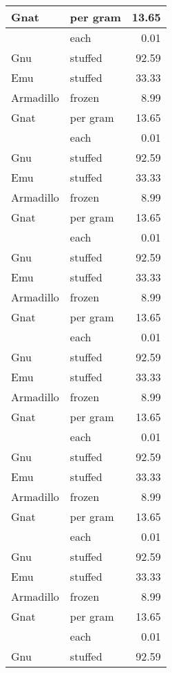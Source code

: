 {\begin{longtable}[l]{|l||l|r|}
\endlastfoot
Gnat      & per gram & 13.65 \\
\hline
          & each     & 0.01  \\
\hline
Gnu       & stuffed  & 92.59 \\
\hline
Emu       & stuffed  & 33.33 \\
\hline
Armadillo & frozen   & 8.99  \\
\hline
Gnat      & per gram & 13.65 \\
\hline
          & each     & 0.01  \\
\hline
Gnu       & stuffed  & 92.59 \\
\hline
Emu       & stuffed  & 33.33 \\
\hline
Armadillo & frozen   & 8.99  \\
\hline
Gnat      & per gram & 13.65 \\
\hline
          & each     & 0.01  \\
\hline
Gnu       & stuffed  & 92.59 \\
\hline
Emu       & stuffed  & 33.33 \\
\hline
Armadillo & frozen   & 8.99  \\
\hline
Gnat      & per gram & 13.65 \\
\hline
          & each     & 0.01  \\
\hline
Gnu       & stuffed  & 92.59 \\
\hline
Emu       & stuffed  & 33.33 \\
\hline
Armadillo & frozen   & 8.99  \\
\hline
Gnat      & per gram & 13.65 \\
\hline
          & each     & 0.01  \\
\hline
Gnu       & stuffed  & 92.59 \\
\hline
Emu       & stuffed  & 33.33 \\
\hline
Armadillo & frozen   & 8.99  \\
\hline
Gnat      & per gram & 13.65 \\
\hline
          & each     & 0.01  \\
\hline
Gnu       & stuffed  & 92.59 \\
\hline
Emu       & stuffed  & 33.33 \\
\hline
Armadillo & frozen   & 8.99  \\
\hline
Gnat      & per gram & 13.65 \\
\hline
          & each     & 0.01  \\
\hline
Gnu       & stuffed  & 92.59 \\

\end{longtable}}
